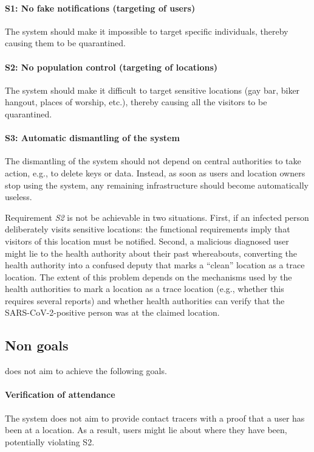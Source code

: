 \paragraph{S1: No fake notifications (targeting of users)} The system should make it impossible to target specific individuals, thereby causing them to be quarantined.

\paragraph{S2: No population control (targeting of locations)} The system should make it difficult to target sensitive locations (gay bar, biker hangout, places of worship, 
etc.), thereby causing all the visitors to be quarantined.

\paragraph{S3: Automatic dismantling of the system}
The dismantling of the system should not depend on central authorities to take action, e.g., to delete keys or data. Instead, as soon as users and location owners stop using the system, any remaining infrastructure should become automatically useless.

\vspace{1mm}
Requirement \textit{S2} is not be achievable in two situations. First, if an infected person deliberately visits sensitive locations: the functional requirements imply that visitors of this location must be notified.
Second, a malicious diagnosed user might lie to the health authority about their past whereabouts, converting the health authority into a confused deputy that marks a ``clean'' location as a trace location. The extent of this problem depends on the mechanisms used by the health authorities to mark a location as a trace location (e.g., whether this requires several reports) and whether health authorities can verify that the SARS-CoV-2-positive person was at the claimed location.

\subsection{Non goals}

\name does not aim to achieve the following goals.

\paragraph{Verification of attendance} The system does not aim to provide contact tracers with a proof that a user has been at a location. As a result, users might lie about where they have been, potentially violating S2.

